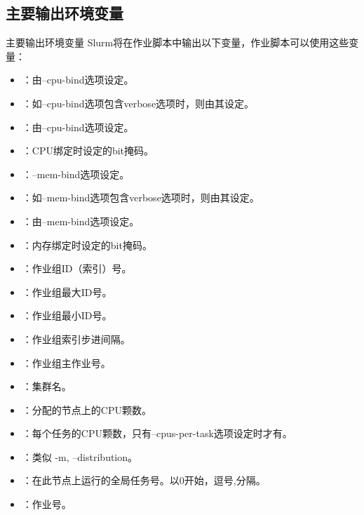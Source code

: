 \subsection{主要输出环境变量}
\begin{frame}{主要输出环境变量}
Slurm将在作业脚本中输出以下变量，作业脚本可以使用这些变量：
\begin{itemize}
      \item {}：由--cpu-bind选项设定。
      \item {}：如--cpu-bind选项包含verbose选项时，则由其设定。
      \item {}：由--cpu-bind选项设定。
      \item {}：CPU绑定时设定的bit掩码。
      \item {}：--mem-bind选项设定。
      \item {}：如--mem-bind选项包含verbose选项时，则由其设定。
      \item {}：由--mem-bind选项设定。
      \item {}：内存绑定时设定的bit掩码。
      \item {}：作业组ID（索引）号。
      \item {}：作业组最大ID号。
      \item {}：作业组最小ID号。
      \item {}：作业组索引步进间隔。
      \item {}：作业组主作业号。
      \item {}：集群名。
      \item {}：分配的节点上的CPU颗数。
      \item {}：每个任务的CPU颗数，只有--cpus-per-task选项设定时才有。
      \item {}：类似 -m, --distribution。
      \item {}：在此节点上运行的全局任务号。以0开始，逗号,分隔。
      \item {}：作业号。

\end{itemize}
\end{frame}
